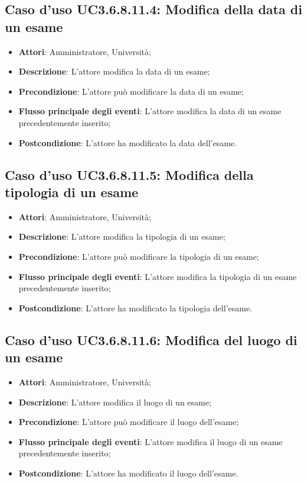 \subsection{Caso d'uso \texorpdfstring{UC3.6.8.11.4}{UC3.6.8.11.4}: Modifica della data di un esame}
\begin{itemize}
\item \textbf{Attori}: Amministratore, Università;
\item \textbf{Descrizione}: L'attore modifica la data di un esame;

\item \textbf{Precondizione}: L'attore può modificare la data di un esame;

\item \textbf{Flusso principale degli eventi}: L'attore modifica la data di un esame precedentemente inserito;

\item \textbf{Postcondizione}: L'attore ha modificato la data dell'esame.

\end{itemize}
\subsection{Caso d'uso \texorpdfstring{UC3.6.8.11.5}{UC3.6.8.11.5}: Modifica della tipologia di un esame}
\begin{itemize}
\item \textbf{Attori}: Amministratore, Università;
\item \textbf{Descrizione}: L'attore modifica la tipologia di un esame;

\item \textbf{Precondizione}: L'attore può modificare la tipologia di un esame;

\item \textbf{Flusso principale degli eventi}: L'attore modifica la tipologia di un esame precedentemente inserito;

\item \textbf{Postcondizione}: L'attore ha modificato la tipologia dell’esame.

\end{itemize}
\subsection{Caso d'uso \texorpdfstring{UC3.6.8.11.6}{UC3.6.8.11.6}: Modifica del luogo di un esame}
\begin{itemize}
\item \textbf{Attori}: Amministratore, Università;
\item \textbf{Descrizione}: L'attore modifica il luogo di un esame;

\item \textbf{Precondizione}: L'attore può modificare il luogo dell'esame;

\item \textbf{Flusso principale degli eventi}: L'attore modifica il luogo di un esame precedentemente inserito;

\item \textbf{Postcondizione}: L'attore ha modificato il luogo dell'esame.

\end{itemize}
